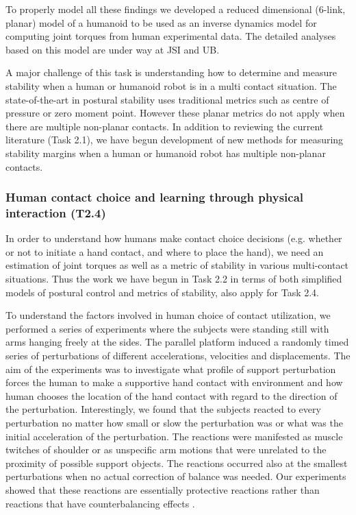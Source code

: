 \documentclass[12pt,a4paper,twoside]{article}
\begin{document}
To properly model all these findings we developed a reduced dimensional (6-link, planar) model of a humanoid to be used as an inverse dynamics model for computing joint torques from human experimental data. The detailed analyses based on this model are under way at JSI and UB.

A major challenge of this task is understanding how to determine and measure stability when a human or humanoid robot is in a multi contact situation. The state-of-the-art in postural stability uses traditional metrics such as centre of pressure or zero moment point. However these planar metrics do not apply when there are multiple non-planar contacts. In addition to reviewing the current literature (Task 2.1), we have begun development of new methods for measuring stability margins when a human or humanoid robot has multiple non-planar contacts.

\subsubsection{Human contact choice and learning through physical interaction (T2.4)}

In order to understand how humans make contact choice decisions (e.g. whether or not to initiate a hand contact, and where to place the hand), we need an estimation of joint torques as well as a metric of stability in various multi-contact situations. Thus the work we have begun in Task 2.2 in terms of both simplified models of postural control and metrics of stability, also apply for Task 2.4.

To understand the factors involved in human choice of contact utilization, we performed a series of experiments where the subjects were standing still with arms hanging freely at the sides. The parallel platform induced a randomly timed series of perturbations of different accelerations, velocities and displacements. The aim of the experiments was to investigate what profile of support perturbation forces the human to make a supportive hand contact with environment and how human chooses the location of the hand contact with regard to the direction of the perturbation. Interestingly, we found that the subjects reacted to every perturbation no matter how small or slow the perturbation was or what was the initial acceleration of the perturbation. The reactions were manifested as muscle twitches of shoulder or as unspecific arm motions that were unrelated to the proximity of possible support objects. The reactions occurred also at the smallest perturbations when no actual correction of balance was needed. Our experiments showed that these reactions are essentially protective reactions rather than reactions that have counterbalancing effects \cite{McIlroy1995, Corbeil2013}.
\end{document}
